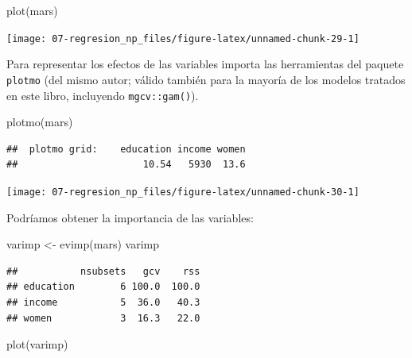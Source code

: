 \documentclass[
]{book}
\newenvironment{Shaded}{\begin{snugshade}}{\end{snugshade}}
\newcommand{\FunctionTok}[1]{\textcolor[rgb]{0.00,0.00,0.00}{#1}}
\newcommand{\NormalTok}[1]{#1}
\newcommand{\OtherTok}[1]{\textcolor[rgb]{0.56,0.35,0.01}{#1}}
\theoremstyle{break}
\theoremstyle{definition}
\theoremstyle{definition}
\theoremstyle{definition}
\theoremstyle{definition}
\theoremstyle{remark}
\begin{document}
\begin{Shaded}
\begin{Highlighting}[]
\FunctionTok{plot}\NormalTok{(mars)}
\end{Highlighting}
\end{Shaded}

\begin{center}\texttt{[image: 07-regresion\_np\_files/figure-latex/unnamed-chunk-29-1]} \end{center}

Para representar los efectos de las variables importa las herramientas del paquete \texttt{plotmo} (del mismo autor; válido también para la mayoría de los modelos tratados en este libro, incluyendo \texttt{mgcv::gam()}).

\begin{Shaded}
\begin{Highlighting}[]
\FunctionTok{plotmo}\NormalTok{(mars)}
\end{Highlighting}
\end{Shaded}

\begin{verbatim}
##  plotmo grid:    education income women
##                      10.54   5930  13.6
\end{verbatim}

\begin{center}\texttt{[image: 07-regresion\_np\_files/figure-latex/unnamed-chunk-30-1]} \end{center}

Podríamos obtener la importancia de las variables:

\begin{Shaded}
\begin{Highlighting}[]
\NormalTok{varimp }\OtherTok{\textless{}{-}} \FunctionTok{evimp}\NormalTok{(mars)}
\NormalTok{varimp}
\end{Highlighting}
\end{Shaded}

\begin{verbatim}
##           nsubsets   gcv    rss
## education        6 100.0  100.0
## income           5  36.0   40.3
## women            3  16.3   22.0
\end{verbatim}

\begin{Shaded}
\begin{Highlighting}[]
\FunctionTok{plot}\NormalTok{(varimp)}
\end{Highlighting}
\end{Shaded}
\end{document}
